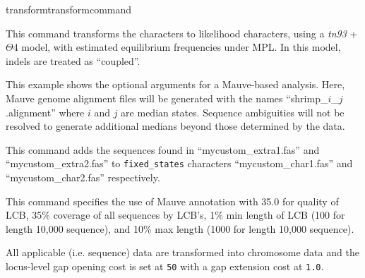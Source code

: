 \begin{command}{transform}{transformcommand}
\begin{poyexamples}
{This command transforms the characters to likelihood characters, using a \emph{tn93} + $\Theta 4$ model, 
with estimated equilibrium frequencies under MPL. In this model, indels are treated as ``coupled''.}

{This example shows the optional arguments for a Mauve-based  analysis.
Here, Mauve genome alignment files will be generated with the names ``shrimp\_$i$\_$j$.alignment'' 
where $i$ and $j$ are median states. Sequence ambiguities will not be resolved to generate 
additional medians beyond those determined by the data.}

{This command adds the sequences found in ``mycustom\_extra1.fas'' and ``mycustom\_extra2.fas'' 
to \texttt{fixed\_states} characters 
``mycustom\_char1.fas'' and ``mycustom\_char2.fas'' respectively.}

{This command specifies the use of Mauve annotation with 35.0 for quality of LCB,
35\% coverage of all sequences by LCB's, 1\% min length of LCB (100 for length 10,000 
sequence), and 10\% max length (1000 for length 10,000 sequence).}



{All applicable (i.e. sequence) data are transformed into chromosome
data and the locus-level gap opening cost is set at \texttt{50}
with a gap extension cost at \texttt{1.0}.}

\end{poyexamples}	  

\end{command}


